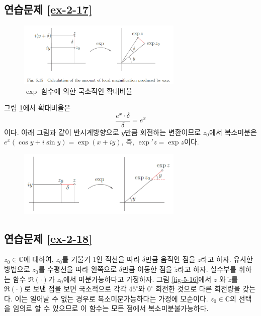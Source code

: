 \subsection*{연습문제 \ref{ex-2-17}}

\begin{figure}[h!]
\begin{center}
\includegraphics[width=0.7\textwidth]{./Solution/figs/fig-5-15}
\end{center}
\caption{$\exp$ 함수에 의한 국소적인 확대비율
}
\label{fig-5-15}
\end{figure}

그림 \ref{fig-5-15}에서
확대비율은
\[
\dfrac{e^x\cdot \delta}{\delta} = e^x
\]
이다. 
아래 그림과 같이 반시계방향으로  $y$만큼 회전하는 변환이므로
$z_0$에서 복소미분은 $e^x(\cos y + i\sin y) = \exp(x+iy)$,
즉, $\exp' z = \exp z$이다.

\begin{figure}[h!]
\begin{center}
\includegraphics[width=0.7\textwidth]{./Solution/figs/fig-s-0-7}
\end{center}
\end{figure}

\subsection*{연습문제 \ref{ex-2-18}}

$z_0 \in \mathbb C$에 대하여,
$z_0$를 기울기 $1$인 직선을 따라 $\delta$만큼 움직인 점을 $z$라고 하자.
유사한 방법으로 $z_0$를 수평선을 따라 왼쪽으로 $\delta$만큼 이동한 점을 $\tilde z$라고 하자.
실수부를 취하는 함수 $\Re(\cdot)$가 $z_0$에서 미분가능하다고 가정하자.
그림 \ref{fig-5-16}에서 $z$ 와 $\tilde z$를 $\Re(\cdot)$로 보낸 점을 보면 
국소적으로 각각 $45^\circ$와 $0^\circ$ 회전한 것으로 다른 회전량을 갖는다.
이는 일어날 수 없는 경우로 복소미분가능하다는 가정에 모순이다.
$z_0\in \mathbb C$의 선택을 임의로  할 수 있으므로
이 함수는 모든 점에서 복소미분불가능하다.


